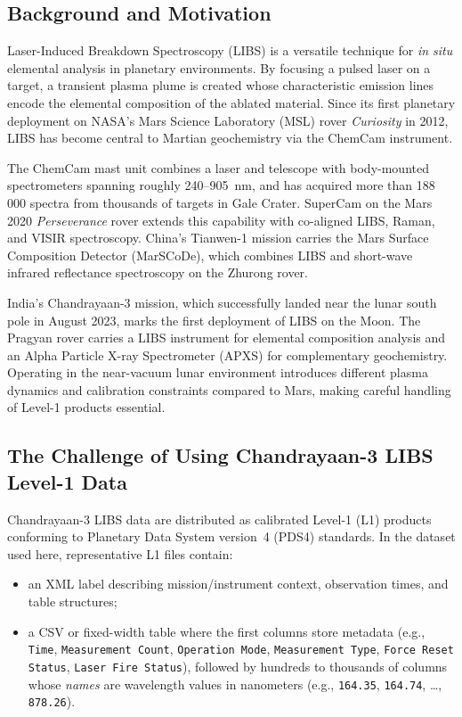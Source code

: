 \documentclass[12pt,a4paper]{article}
\begin{document}
\subsection{Background and Motivation}

Laser-Induced Breakdown Spectroscopy (LIBS) is a versatile technique for \emph{in situ} elemental analysis in planetary environments.\cite{Cremers2006} By focusing a pulsed laser on a target, a transient plasma plume is created whose characteristic emission lines encode the elemental composition of the ablated material. Since its first planetary deployment on NASA's Mars Science Laboratory (MSL) rover \emph{Curiosity} in 2012, LIBS has become central to Martian geochemistry via the ChemCam instrument.\cite{Wiens2012,Maurice2012,Mangold2016}

The ChemCam mast unit combines a laser and telescope with body-mounted spectrometers spanning roughly 240--905~nm, and has acquired more than 188\,000 spectra from thousands of targets in Gale Crater.\cite{Mangold2016} SuperCam on the Mars 2020 \emph{Perseverance} rover extends this capability with co-aligned LIBS, Raman, and VISIR spectroscopy.\cite{Wiens2020,Bernardi2021} China's Tianwen-1 mission carries the Mars Surface Composition Detector (MarSCoDe), which combines LIBS and short-wave infrared reflectance spectroscopy on the Zhurong rover.\cite{Xu2021,MarSCoDe2024}

India's Chandrayaan-3 mission, which successfully landed near the lunar south pole in August 2023, marks the first deployment of LIBS on the Moon.\cite{ISROCh3web} The Pragyan rover carries a LIBS instrument for elemental composition analysis and an Alpha Particle X-ray Spectrometer (APXS) for complementary geochemistry.\cite{ISROCh3web} Operating in the near-vacuum lunar environment introduces different plasma dynamics and calibration constraints compared to Mars, making careful handling of Level-1 products essential.

\subsection{The Challenge of Using Chandrayaan-3 LIBS Level-1 Data}

Chandrayaan-3 LIBS data are distributed as calibrated Level-1 (L1) products conforming to Planetary Data System version~4 (PDS4) standards.\cite{Hughes2018} In the dataset used here, representative L1 files contain:

\begin{itemize}[nosep]
  \item an XML label describing mission/instrument context, observation times, and table structures;
  \item a CSV or fixed-width table where the first columns store metadata (e.g., \texttt{Time}, \texttt{Measurement Count}, \texttt{Operation Mode}, \texttt{Measurement Type}, \texttt{Force Reset Status}, \texttt{Laser Fire Status}), followed by hundreds to thousands of columns whose \emph{names} are wavelength values in nanometers (e.g., \texttt{164.35}, \texttt{164.74}, \ldots, \texttt{878.26}).
\end{itemize}
\end{document}
